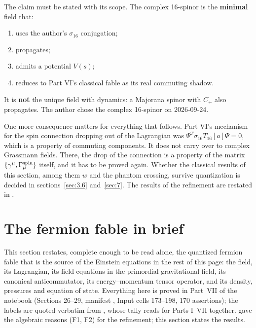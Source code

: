 The claim must be stated with its scope. The complex 16-spinor is the \textbf{minimal} field
that:
\begin{enumerate}
  \item uses the author's $\sigma_{16}$ conjugation;
  \item propagates;
  \item admits a potential $V(s)$;
  \item reduces to Part VI's classical fable as its real commuting shadow.
\end{enumerate}
It is \textbf{not} the unique field with dynamics: a Majorana spinor with $C_+$ also propagates.
The author chose the complex 16-spinor on 2026-09-24.

One more consequence matters for everything that follows. Part VI's mechanism for the spin
connection dropping out of the Lagrangian was $\Psi^{T}\sigma_{16}T_{16}[a]\Psi=0$, which is a
property of commuting components. It does not carry over to complex Grassmann fields. There, the
drop of the connection is a property of the matrix $\{\gamma^\mu,\Gamma^{\rm spin}_\mu\}$ itself,
and it has to be proved again. Whether the classical results of this section, among them $w$ and
the phantom crossing, survive quantization is decided in sections~\ref{sec:3.6} and~\ref{sec:7}. The
results of the refinement are restated in .

\endgroup

\section{The fermion fable in brief}
\label{sec:3}

This section restates, complete enough to be read alone, the quantized fermion fable that is the
source of the Einstein equations in the rest of this page: the field, its Lagrangian, its field
equations in the primordial gravitational field, its canonical anticommutator, its energy--momentum
tensor operator, and its density, pressures and equation of state. Everything here is proved in
Part~VII of the notebook (Sections 26--29, manifest , Input cells
173--198, 170 assertions); the labels are quoted verbatim from
, whose tally reads
 for Parts I--VII together.
 gave the algebraic reasons (F1, F2) for the refinement; this section states the
results.

